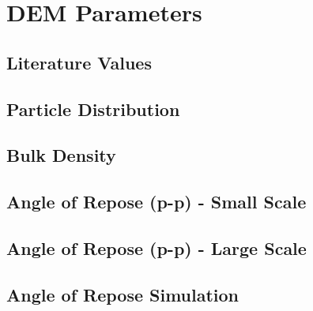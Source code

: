 
\chapter{DEM Parameters}
\label{cap:demparameters}

\lipsum[1]

\section{Literature Values}
\label{sec:literaturevalues}

\lipsum[1]

\section{Particle Distribution}
\label{sec:particledistribution}

\lipsum[1]

% 

\section{Bulk Density}
\label{sec:bulkdensity}


\lipsum[1]


\section{Angle of Repose (p-p) - Small Scale}
\label{sec:aor}


\lipsum[1]

\section{Angle of Repose (p-p) - Large Scale}
\label{sec:aorlargescale}


\lipsum[1]

\section{Angle of Repose Simulation}
\label{sec:aorsimulation}


